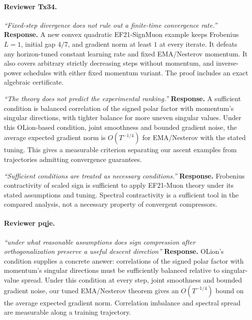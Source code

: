 \paragraph{Reviewer Tx34.}
\noindent\emph{``Fixed-step divergence does not rule out a finite-time convergence rate.''}
\textbf{Response.} A new convex quadratic EF21-SignMuon example keeps Frobenius $L=1$, initial gap $4/7$, and gradient norm at least $1$ at every iterate. It defeats any horizon-tuned constant learning rate and fixed EMA/Nesterov momentum. It also covers arbitrary strictly decreasing steps without momentum, and inverse-power schedules with either fixed momentum variant. The proof includes an exact algebraic certificate.

\noindent\emph{``The theory does not predict the experimental ranking.''}
\textbf{Response.} A sufficient condition is balanced correlation of the signed polar factor with momentum's singular directions, with tighter balance for more uneven singular values. Under this OLion-based condition, joint smoothness and bounded gradient noise, the average expected gradient norm is $O(T^{-1/4})$ for EMA/Nesterov with the stated tuning. This gives a measurable criterion separating our ascent examples from trajectories admitting convergence guarantees.

\noindent\emph{``Sufficient conditions are treated as necessary conditions.''}
\textbf{Response.} Frobenius contractivity of scaled sign is sufficient to apply EF21-Muon theory under its stated assumptions and tuning. Spectral contractivity is a sufficient tool in the compared analysis, not a necessary property of convergent compressors.

\paragraph{Reviewer pqje.}
\noindent\emph{``under what reasonable assumptions does sign compression after orthogonalization preserve a useful descent direction''}
\textbf{Response.} OLion's condition supplies a concrete answer: correlations of the signed polar factor with momentum's singular directions must be sufficiently balanced relative to singular-value spread. Under this condition at every step, joint smoothness and bounded gradient noise, our tuned EMA/Nesterov theorem gives an $O(T^{-1/4})$ bound on the average expected gradient norm. Correlation imbalance and spectral spread are measurable along a training trajectory.

